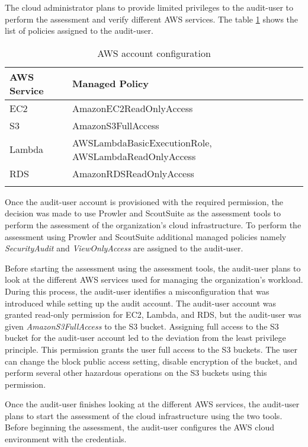 The cloud administrator plans to provide limited privileges to the audit-user to perform the assessment and verify different AWS services.
The table \ref{tab:accountconfiguration} shows the list
of policies assigned to the audit-user.
\\
\begin{longtable}{|p{6cm}|p{8cm}|}
    \hline
    \textbf{AWS Service} & \textbf{Managed Policy}\\
    \hline
    EC2 & AmazonEC2ReadOnlyAccess \\
    \hline
    S3 & AmazonS3FullAccess \\
    \hline
    Lambda & AWSLambdaBasicExecutionRole,
    AWSLambdaReadOnlyAccess \\
    \hline
    RDS & AmazonRDSReadOnlyAccess \\
    \hline
    \caption{AWS account configuration}
    \label{tab:accountconfiguration}
\end{longtable}



\par Once the audit-user account is provisioned with the required permission, the decision was made to use Prowler and ScoutSuite as the assessment tools to perform the assessment of the organization’s cloud infrastructure.
To perform the assessment using Prowler and ScoutSuite additional managed policies namely \textit{SecurityAudit} and \textit{ViewOnlyAccess} are assigned to the audit-user.

\par Before starting the assessment using the assessment tools, the audit-user plans to look at the different AWS services used for managing the organization’s workload.
During this process, the audit-user identifies a misconfiguration that was introduced while setting up the audit account.
The audit-user account was granted read-only permission
for EC2, Lambda, and RDS, but the audit-user was given \textit{AmazonS3FullAccess} to the S3 bucket.
Assigning full access to the S3 bucket for the audit-user account led to the deviation from the least privilege principle.
This permission grants the user full access to the S3 buckets.
The user can change the block public access setting, disable encryption of the bucket, and perform several other hazardous operations on the S3 buckets using this permission.

\par Once the audit-user finishes looking at the different AWS services, the audit-user plans to start the assessment of the cloud infrastructure using the two tools.
Before beginning the assessment, the audit-user configures the AWS cloud environment with the credentials.

